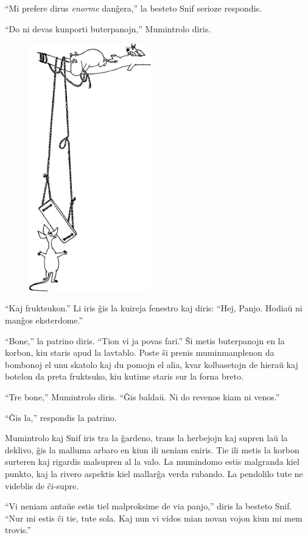 ``Mi prefere dirus \emph{enorme} danĝera,'' la besteto Snif serioze respondis.

``Do ni devas kunporti buterpanojn,'' Mumintrolo diris.

\begin{figure}[htbp]
\centering
\includegraphics[width=150pt,height=305pt]{1-2.png}
\caption{}
\label{1-2}
\end{figure}

``Kaj fruktsukon.'' Li iris ĝis la kuireja fenestro kaj diris: ``Hej, Panjo. Hodiaŭ ni manĝos eksterdome.''

``Bone,'' la patrino diris. ``Tion vi ja povas fari.'' Ŝi metis buterpanojn en la korbon, kiu staris apud la lavtablo. Poste ŝi prenis muminmanplenon da bombonoj el unu skatolo kaj du pomojn el alia, kvar kolbasetojn de hieraŭ kaj botelon da preta fruktsuko, kiu kutime staris sur la forna breto.

``Tre bone,'' Mumintrolo diris. ``Ĝis baldaŭ. Ni do revenos kiam ni venos.''

``Ĝis la,'' respondis la patrino.

Mumintrolo kaj Snif iris tra la ĝardeno, trans la herbejojn kaj supren laŭ la deklivo, ĝis la malluma arbaro en kiun ili neniam eniris. Tie ili metis la korbon surteren kaj rigardis malsupren al la valo. La mumindomo estis malgranda kiel punkto, kaj la rivero aspektis kiel mallarĝa verda rubando. La pendolilo tute ne videblis de ĉi-supre.

``Vi neniam antaŭe estis tiel malproksime de via panjo,'' diris la besteto Snif. ``Nur mi estis ĉi tie, tute sola. Kaj nun vi vidos mian novan vojon kiun mi mem trovis.''

